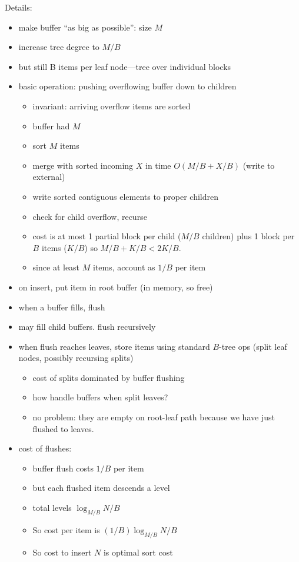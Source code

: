 \documentclass{article}
\begin{document}
Details:
\begin{itemize}
\item make buffer ``as big as possible'': size $M$
\item increase tree degree to $M/B$
\item but still B items per leaf node---tree over individual blocks
\item basic operation: pushing overflowing buffer down to children
\begin{itemize}
\item invariant: arriving overflow items are sorted 
\item buffer had $M$
\item sort $M$ items
\item merge with sorted incoming $X$ in time $O(M/B+X/B)$ (write to external)
\item write sorted contiguous elements to proper children
\item check for child overflow, recurse
\item cost is at most 1 partial block per child ($M/B$ children) plus 1 block per $B$
  items ($K/B$) so $M/B+K/B < 2K/B$.
\item since at least $M$ items, account as $1/B$ per item
\end{itemize}
\item on insert, put item in root buffer (in memory, so free)
\item when a buffer fills, flush
\item may fill child buffers.  flush recursively
\item when flush reaches leaves, store items using standard $B$-tree
  ops (split leaf nodes, possibly recursing splits)
\begin{itemize}
\item cost of splits dominated by buffer flushing
\item how handle buffers when split leaves?
\item no problem: they are empty on root-leaf path
  because we have just flushed to leaves.
\end{itemize}
\item cost of flushes:
\begin{itemize}
\item buffer flush costs $1/B$ per item
\item but each flushed item descends a level
\item total levels $\log_{M/B} N/B$
\item So cost per item is $(1/B)\log_{M/B} N/B$
\item So cost to insert $N$ is optimal sort cost
\end{itemize}
\end{itemize}
\end{document}
